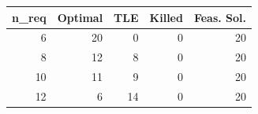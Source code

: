 
\begin{tabular}{rrrrr}
\toprule
n\_req & Optimal & TLE & Killed & Feas. Sol.\\
\midrule
6 & 20 & 0 & 0 & 20\\
8 & 12 & 8 & 0 & 20\\
10 & 11 & 9 & 0 & 20\\
12 & 6 & 14 & 0 & 20\\
\bottomrule
\end{tabular}
